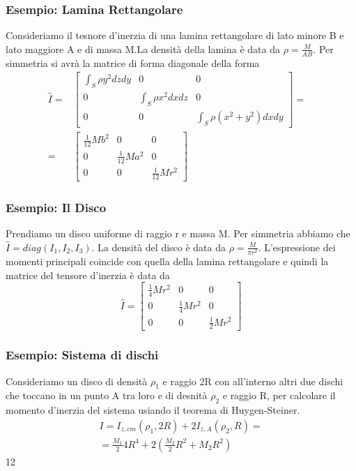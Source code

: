 \subsubsection{Esempio: Lamina Rettangolare}
Consideriamo il tesnore d'inerzia di una lamina rettangolare di lato minore B e lato maggiore A e di massa M.La densit\`{a} della lamina \`{e} data da $\rho = \frac{M}{AB}$. Per simmetria si avr\`{a} la matrice di forma diagonale della forma
\begin{equation*}
\begin{aligned}
\hat{I} = 
	&\left [  \begin{array}{ccc}
  	\int_{S}\rho y^2dzdy & 0 & 0 \\[0.1in]
  	0 & \int_{S} \rho x^2 dxdz & 0 \\[0.1in]
  	0 & 0& \int_{S} \rho (x^2 + y^2)dxdy
  \end{array}
\right] =&\\[0.25in] = 
	&\left [  \begin{array}{ccc}
  	\frac{1}{12}Mb^2 & 0 & 0 \\[0.1in]
  	0 & \frac{1}{12}Ma^2 & 0 \\[0.1in]
  	0 & 0& \frac{1}{12}Mr^2
  \end{array}
\right]
\end{aligned}
\end{equation*}
\subsubsection{Esempio: Il Disco}
Prendiamo un disco uniforme di raggio r e massa M. Per simmetria abbiamo che $\hat{I} = diag(I_1,I_2,I_3)$. La densit\`{a} del disco \`{e} data da $\rho  = \frac{M}{\pi r^2}$. L'espressione dei momenti principali coincide con quella della lamina rettangolare e quindi la matrice del tensore d'inerzia \`{e} data da 
\begin{equation*}
	\hat{I} = 
	\left [  \begin{array}{ccc}
  	\frac{1}{4}Mr^2 & 0 & 0 \\[0.1in]
  	0 & \frac{1}{4}Mr^2 & 0 \\[0.1in]
  	0 & 0& \frac{1}{2}Mr^2
  \end{array}
\right]
\end{equation*}
\subsubsection{Esempio: Sistema di dischi}
Consideriamo un disco di densit\`{a} $\rho_1$ e raggio 2R con all'interno altri due dischi che toccano in un punto A tra loro e di desnit\`{a} $\rho_2$ e raggio R, per calcolare il momento d'inerzia del sistema usiando il teorema di Huygen-Steiner.
\begin{equation*}
\begin{aligned}
	& I = I_{z,cm}(\rho_1,2R) + 2I_{z,A}(\rho_2 ,R) = &\\[0.1in]
	& = \frac{M_1}{2}4R^4 +2 \left (\frac{M_2}{2}R^2 + M_2 R^2 \right)
\end{aligned}
\end{equation*}
12
